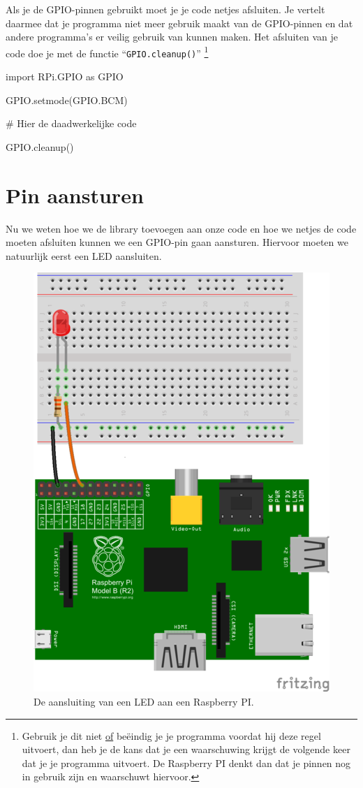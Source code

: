 \documentclass{guide}
\begin{document}
Als je de GPIO-pinnen gebruikt moet je je code netjes afsluiten. Je vertelt daarmee dat je programma niet meer gebruik maakt van de GPIO-pinnen en dat andere programma's er veilig gebruik van kunnen maken. Het afsluiten van je code doe je met de functie \enquote{\texttt{GPIO.cleanup()}} \footnote{Gebruik je dit niet \underline{of} beëindig je je programma voordat hij deze regel uitvoert, dan heb je de kans dat je een waarschuwing krijgt de volgende keer dat je je programma uitvoert. De Raspberry PI denkt dan dat je pinnen nog in gebruik zijn en waarschuwt hiervoor.}

\begin{python}[caption={De GPIO library inladen en afsluiten}, label=code:importeer_library]
import RPi.GPIO as GPIO

GPIO.setmode(GPIO.BCM)

  # Hier de daadwerkelijke code

GPIO.cleanup()
\end{python}

\section{Pin aansturen}
\label{sec:pin_aansturen}
Nu we weten hoe we de library toevoegen aan onze code en hoe we netjes de code moeten afsluiten kunnen we een GPIO-pin gaan aansturen. Hiervoor moeten we natuurlijk eerst een LED aansluiten.

\begin{figure}[ht]
\centering
\includegraphics[scale=0.5]{images/PI_and_LED.png}
\caption{De aansluiting van een LED aan een Raspberry PI.} \label{fig:PI_and_LED}
\end{figure}
\end{document}
